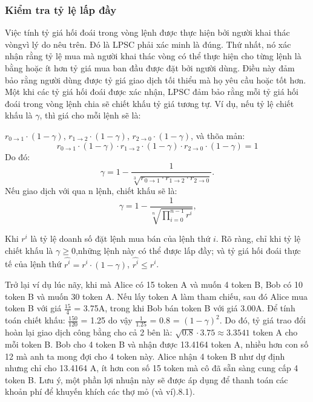 \documentclass[12pt,a4paper]{article}
\begin{document}
\begin{multicols}{2}
\subsubsection{Kiểm tra tỷ lệ lấp đầy\label{sec:fill_rate_check}}
Việc tính tỷ giá hối đoái trong vòng lệnh được thực hiện bởi người khai thác vòngvì lý do nêu trên. Đó là LPSC phải xác minh là đúng. Thứ nhất, nó xác nhận rằng tỷ lệ mua mà người khai thác vòng có thể thực hiện cho từng lệnh là bằng hoặc ít hơn tỷ giá mua ban đầu được đặt bởi người dùng. Điều này đảm bảo rằng người dùng được tỷ giá giao dịch tối thiểu mà họ yêu cầu hoặc tốt hơn. Một khi các tỷ giá hối đoái được xác nhận, LPSC đảm bảo rằng mỗi tỷ giá hối đoái trong vòng lệnh chia sẽ chiết khấu tỷ giá tương tự. Ví dụ, nếu tỷ lệ chiết khấu là $\gamma$, thì giá cho mỗi lệnh sẽ là:

$r_{0\rightarrow 1} \cdot (1-\gamma)$, $r_{1\rightarrow 2} \cdot (1-\gamma)$, $r_{2 \rightarrow 0} \cdot (1-\gamma)$, và thõa mản:
\begin{equation}
r_{0\rightarrow 1} \cdot (1-\gamma)\cdot r_{1\rightarrow 2} \cdot (1-\gamma) \cdot r_{2 \rightarrow 0} \cdot (1-\gamma) = 1
\end{equation}
Do đó:
\begin{equation}
\gamma = 1- \frac{1}{\sqrt[3]{r_{0\rightarrow 1} \cdot r_{1\rightarrow 2} \cdot r_{2\rightarrow 0}}}\text{.}
\end{equation}
Nếu giao dịch với qua n lệnh, chiết khấu sẽ là:
\begin{equation}
\gamma = 1- \frac{1}{\sqrt[n]{\prod_{i=0}^{n-1} r^i}} \text{,}
\end{equation}

Khi $r^i$   là tỷ lệ doanh số đặt lệnh mua bán của lệnh thứ $i$. Rõ ràng, chỉ khi tỷ lệ chiết khấu là $\gamma \ge 0$,những lệnh này có thể được lấp đầy; và tỷ giá hối đoái thực tế của lệnh thứ $\hat{r^i} = r^i \cdot (1-\gamma)$, $\hat{r^i}\le r^i$.

Trở lại ví dụ lúc nãy, khi mà Alice có 15 token A và muốn 4 token B, Bob có 10 token B và muốn 30 token A. Nếu lấy token A làm tham chiếu, sau đó Alice mua token B với giá $\frac{15}{4}$ = 3.75A, trong khi Bob bán token B với giá 3.00A. Để tính toán chiết khấu: $\frac{150}{120}$ = 1.25 do vậy $\frac{1}{1.25}$ = 0.8 = $(1 - \gamma)^2$. Do đó, tỷ giá trao đổi hoàn lại giao dịch công bằng cho cả 2 bên là: $\sqrt{0.8}\cdot 3.75 \approx 3.3541$ token A cho mỗi token B. Bob cho 4 token B và nhận được 13.4164 token A, nhiều hơn con số 12 mà anh ta mong đợi cho 4 token này. Alice nhận 4 token B như dự định nhưng chỉ cho 13.4164 A, ít hơn con số 15 token mà cô đã sẵn sàng cung cấp 4 token B. Lưu ý, một phần lợi nhuận này sẽ được áp dụng để thanh toán các khoản phí để khuyến khích các thợ mỏ (và ví).8.1).


\end{multicols}
\end{document}
